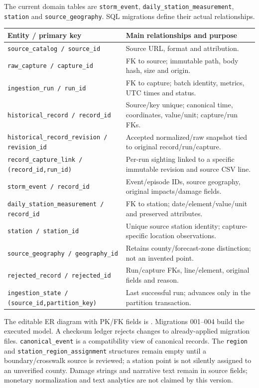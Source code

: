 \documentclass[10pt]{article}
\begin{document}
The current domain tables are \texttt{storm\_event},
\texttt{daily\_station\_measurement}, \texttt{station} and
\texttt{source\_geography}. SQL migrations define their actual relationships.

\begin{tabularx}{\textwidth}{@{}L{5.2cm}Y@{}}
\toprule
Entity / primary key & Main relationships and purpose\\
\midrule
\texttt{source\_catalog / source\_id} & Source URL, format and attribution.\\
\texttt{raw\_capture / capture\_id} & FK to source; immutable path, body hash, size and origin.\\
\texttt{ingestion\_run / run\_id} & FK to capture; batch identity, metrics, UTC times and status.\\
\texttt{historical\_record / record\_id} & Source/key unique; canonical time, coordinates, value/unit; capture/run FKs.\\
\texttt{historical\_record\_revision / revision\_id} & Accepted normalized/raw snapshot tied to original record/run/capture.\\
\texttt{record\_capture\_link / (record\_id,run\_id)} & Per-run sighting linked to a specific immutable revision and source CSV line.\\
\texttt{storm\_event / record\_id} & Event/episode IDs, source geography, original impacts/damage fields.\\
\texttt{daily\_station\_measurement / record\_id} & FK to station; date/element/value/unit and preserved attributes.\\
\texttt{station / station\_id} & Unique source station identity; capture-specific location observations.\\
\texttt{source\_geography / geography\_id} & Retains county/forecast-zone distinction; not an invented point.\\
\texttt{rejected\_record / rejected\_id} & Run/capture FKs, line/element, original fields and reason.\\
\texttt{ingestion\_state / (source\_id,partition\_key)} & Last successful run; advances only in the partition transaction.\\
\bottomrule
\end{tabularx}

The editable ER diagram with PK/FK fields is
. Migrations 001--004 build the executed
model. A checksum ledger rejects changes to already-applied migration files.
\texttt{canonical\_event} is a compatibility view of canonical records.
The \texttt{region} and \texttt{station\_region\_assignment} structures remain
empty until a boundary/crosswalk source is reviewed; a station point is not
silently assigned to an unverified county. Damage strings and narrative text
remain in source fields; monetary normalization and text analytics are not
claimed by this version.
\end{document}
